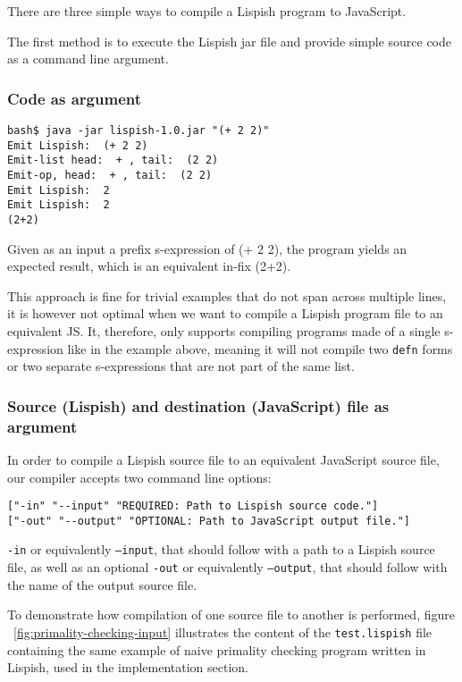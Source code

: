There are three simple ways to compile a Lispish program to JavaScript. 

The first method is to execute the Lispish jar file and provide simple source code as a command line argument.

\subsubsection{Code as argument}

\begin{verbatim}
bash$ java -jar lispish-1.0.jar "(+ 2 2)"
Emit Lispish:  (+ 2 2)
Emit-list head:  + , tail:  (2 2)
Emit-op, head:  + , tail:  (2 2)
Emit Lispish:  2
Emit Lispish:  2
(2+2)
\end{verbatim}

Given as an input a prefix s-expression of (+ 2 2), the program yields an expected result, which is an equivalent in-fix (2+2).

This approach is fine for trivial examples that do not span across multiple lines, it is however not optimal when we want to compile a Lispish program file to an equivalent JS. 
It, therefore, only supports compiling programs made of a single s-expression like in the example above, meaning it will not compile two \texttt{defn} forms or two separate s-expressions that are not part of the same list. 

\subsubsection{Source (Lispish) and destination (JavaScript) file as argument}

In order to compile a Lispish source file to an equivalent JavaScript source file, our compiler accepts two command line options:

\begin{verbatim}
["-in" "--input" "REQUIRED: Path to Lispish source code."]
["-out" "--output" "OPTIONAL: Path to JavaScript output file."]
\end{verbatim}

\texttt{-in} or equivalently \texttt{--input}, that should follow with a path to a Lispish source file, as well as an optional 
\texttt{-out} or equivalently \texttt{--output}, that should follow with the name of the output source file. 

To demonstrate how compilation of one source file to another is performed, figure ~\ref{fig:primality-checking-input} illustrates the content of the \texttt{test.lispish} file containing the same example of naive primality checking program written in Lispish, used in the implementation section. 

